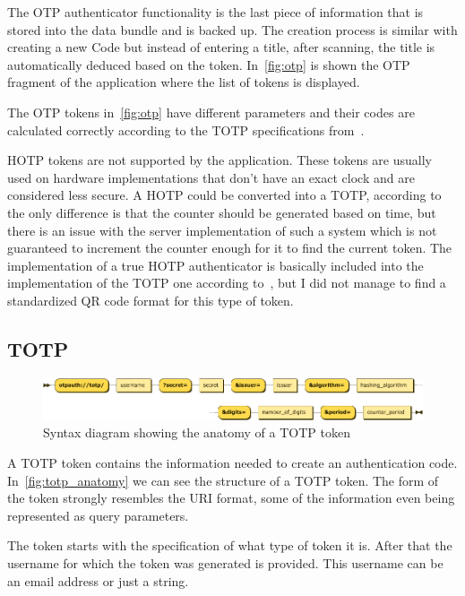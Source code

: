 \documentclass[a4paper,12pt]{report}
\begin{document}
The OTP authenticator functionality is the last piece of information that is
stored into the data bundle and is backed up. The creation process is similar
with creating a new Code but instead of entering a title, after scanning, the
title is automatically deduced based on the token. In~\autoref{fig:otp} is
shown the OTP fragment of the application where the list of tokens is
displayed.

The OTP tokens in~\autoref{fig:otp} have different parameters and their codes
are calculated correctly according to the TOTP specifications from~\cite{totp}.

HOTP tokens are not supported by the application. These tokens are usually used
on hardware implementations that don't have an exact clock and are considered
less secure. A HOTP could be converted into a TOTP, according to~\cite{totp}
the only difference is that the counter should be generated based on time, but
there is an issue with the server implementation of such a system which is not
guaranteed to increment the counter enough for it to find the current token.
The implementation of a true HOTP authenticator is basically included into the
implementation of the TOTP one according to~\cite{totp}, but I did not manage
to find a standardized QR code format for this type of token.

\subsection{TOTP}

\begin{figure}[H]
    \centering
    \includegraphics[scale=0.69]{diagrams/syntax/TOTP.png}
    \caption{Syntax diagram showing the anatomy of a TOTP token}\label{fig:totp_anatomy}
\end{figure}

A TOTP token contains the information needed to create an authentication code.
In~\autoref{fig:totp_anatomy} we can see the structure of a TOTP token. The
form of the token strongly resembles the URI format, some of the information
even being represented as query parameters.

The token starts with the specification of what type of token it is. After that
the username for which the token was generated is provided. This username can
be an email address or just a string.
\end{document}
